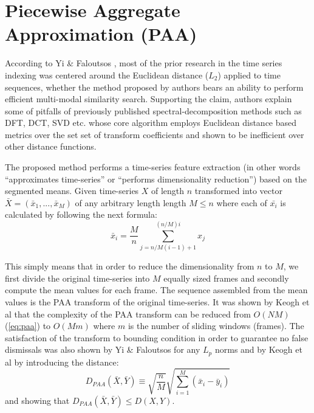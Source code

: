 \section{Piecewise Aggregate Approximation (PAA)} \label{paa}
According to Yi \& Faloutsos \cite{citeulike:2946589}, most of the prior research in the time series indexing was centered around the Euclidean distance ($L_{2}$) applied to time sequences, whether the method proposed by authors bears an ability to perform efficient multi-modal similarity search. Supporting the claim, authors explain some of pitfalls of previously published spectral-decomposition methods such as DFT, DCT, SVD etc. whose core algorithm employs Euclidean distance based metrics over the set set of transform coefficients and shown to be inefficient over other distance functions.

The proposed method performs a time-series feature extraction (in other words ``approximates time-series'' or ``performs dimensionality reduction'') based on the segmented means. Given time-series $X$ of length $n$ transformed into vector $\bar{X} = ( \bar{x}_{1}, ..., \bar{x}_{M} )$ of any arbitrary length length $M \leq n$ where each of $\bar{x_{i}}$ is calculated by following the next formula:
\begin{equation}
\bar{x}_{i} = \frac{M}{n} \sum_{j=n/M(i-1)+1}^{(n/M)i} x_{j}
\label{eq:paa}
\end{equation}

This simply means that in order to reduce the dimensionality from $n$ to $M$, we first divide the original time-series into $M$ equally sized frames and secondly compute the mean values for each frame. The sequence assembled from the mean values is the PAA transform of the original time-series. It was shown by Keogh et al that the complexity of the PAA transform can be reduced from $O(NM)$ (\ref{eq:paa}) to $O(Mm)$ where $m$ is the number of sliding windows (frames). The satisfaction of the transform to bounding condition in order to guarantee no false dismissals was also shown by Yi \& Faloutsos for any $L_{p}$ norms and by Keogh et al \cite{citeulike:3000416} by introducing the distance:
\begin{equation}
D_{PAA}(\bar{X}, \bar{Y}) \equiv \sqrt{\frac{n}{M}} \sqrt{ \sum_{i=1}^{M} 
\left(  \bar{x}_{i} - \bar{y}_{i} \right)}
\label{eq:paa_distance}
\end{equation}
and showing that $D_{PAA}(\bar{X}, \bar{Y}) \leq D(X,Y)$.


